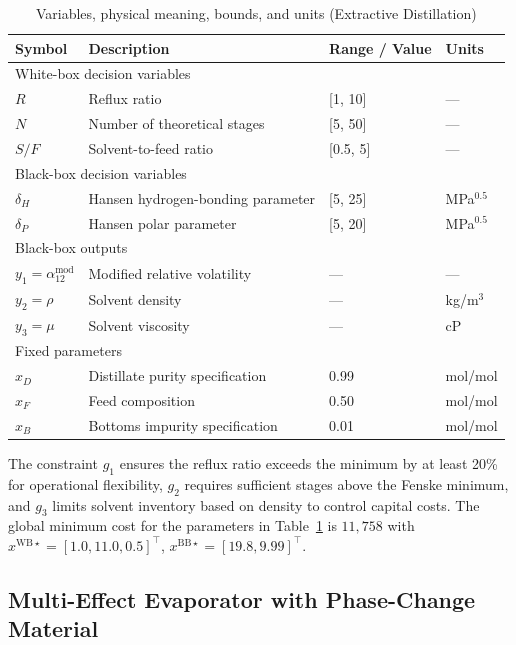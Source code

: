 \documentclass[12pt,a4paper]{article}%
\theoremstyle{plain}%
\theoremstyle{remark}%
\theoremstyle{definition}%
\def\WB{\mathrm{WB}}
\def\BB{\mathrm{BB}}
\begin{document}
\begin{appendices}
\begin{table}[htbp]
\centering
\caption{Variables, physical meaning, bounds, and units (Extractive Distillation)}
\label{tab:distillation_vars}
\begin{tabular}{@{}llll@{}}
\toprule
\textbf{Symbol} & \textbf{Description} & \textbf{Range / Value} & \textbf{Units} \\
\midrule
\multicolumn{4}{l}{White-box decision variables} \\
\midrule
$R$ & Reflux ratio & [1, 10] & --- \\
$N$ & Number of theoretical stages & [5, 50] & --- \\
$S/F$ & Solvent-to-feed ratio & [0.5, 5] & --- \\
\midrule
\multicolumn{4}{l}{Black-box decision variables} \\
\midrule
$\delta_H$ & Hansen hydrogen-bonding parameter & [5, 25] & MPa$^{0.5}$ \\
$\delta_P$ & Hansen polar parameter & [5, 20] & MPa$^{0.5}$ \\
\midrule
\multicolumn{4}{l}{Black-box outputs} \\
\midrule
$y_1 = \alpha_{12}^{\text{mod}}$ & Modified relative volatility & --- & --- \\
$y_2 = \rho$ & Solvent density & --- & kg/m$^3$ \\
$y_3 = \mu$ & Solvent viscosity & --- & cP \\
\midrule
\multicolumn{4}{l}{Fixed parameters} \\
\midrule
$x_D$ & Distillate purity specification & 0.99 & mol/mol \\
$x_F$ & Feed composition & 0.50 & mol/mol \\
$x_B$ & Bottoms impurity specification & 0.01 & mol/mol \\
\bottomrule
\end{tabular}
\end{table}

The constraint $g_1$ ensures the reflux ratio exceeds the minimum by at least 20\% for operational flexibility, $g_2$ requires sufficient stages above the Fenske minimum, and $g_3$ limits solvent inventory based on density to control capital costs. The global minimum cost for the parameters in Table~\ref{tab:distillation_vars} is $11{,}758$ with $x^{\WB\star} = [1.0, 11.0, 0.5]^\top$, $x^{\BB\star} = [19.8, 9.99]^\top$.

\subsection{Multi-Effect Evaporator with Phase-Change Material}\label{subsec:app_evaporator}


\end{appendices}
\end{document}
